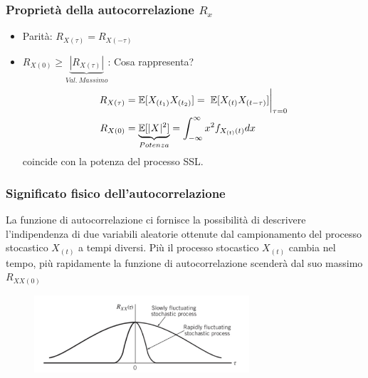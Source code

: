         \subsubsection{Proprietà della autocorrelazione $R_x$}
            \begin{itemize}
                \item {Parità: $R_{X(\tau)} = R_{X(-\tau)}$}
                \item {$R_{X(0)}\geq \underset{Val.\ Massimo}{\underbrace{\left|R_{X(\tau)}\right|}}$: Cosa rappresenta?
                    \begin{align}
                        R_{X(\tau)} &= \mathbb{E}[X_{(t_1)}X_{(t_2)}]=\eval*{\mathbb{E}[X_{(t)}X_{(t-\tau)}] }_{\tau = 0} \nonumber \\
                        R_{X(0)}    &= \underset{Potenza}{\underbrace{\mathbb{E}[|X|^2]}} = \int_{-\infty}^{\infty} x^2f_{X_{(t)}(t)}dx \nonumber
                    \end{align}
                    coincide con la potenza del processo SSL.
                }
            \end{itemize}
        \subsubsection{Significato fisico dell'autocorrelazione}
            La funzione di autocorrelazione ci fornisce la possibilità di descrivere l'indipendenza di due variabili aleatorie ottenute dal campionamento
            del processo stocastico $X_{(t)}$ a tempi diversi. Più il processo stocastico $X_{(t)}$ cambia nel tempo, più rapidamente la funzione di autocorrelazione 
            scenderà dal suo massimo $R_{XX(0)}$
            \begin{figure}[H]
                \centering
                \includegraphics[width = 8cm]{media/autocorrelazione stocastica.png}
            \end{figure}
